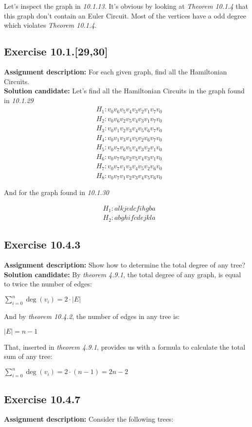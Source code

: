 \documentclass{report}
\newcommand{\cent}[1]{\begin{center}#1\end{center}}
\newcommand{\mAlign}[1]{\begin{align*}#1\end{align*}}
\newcommand{\AssignmentDescription}{\textbf{Assignment description: }}
\newcommand{\Solution}{\textbf{Solution candidate: }}
\newcommand{\Exercise}[1]{\subsection{Exercise #1}}
\begin{document}
	Let's inspect the graph in \textit{10.1.13}. It's obvious by looking at \textit{Theorem 10.1.4} that this graph don't contain an Euler Circuit. Most of the vertices have a odd degree which violates \textit{Theorem 10.1.4}.
	
	\Exercise{10.1.[29,30]}
	
	\AssignmentDescription
	For each given graph, find all the Hamiltonian Circuits.\\
	
	\Solution
	Let's find all the Hamiltonian Circuits in the graph found in \textit{10.1.29}
	\mAlign{&H_1 : v_0 v_6 v_5 v_4 v_3 v_2 v_1 v_7 v_0 \\
				 &H_2 : v_0 v_6 v_2 v_5 v_4 v_3 v_1 v_7 v_0 \\
			 	&H_3 : v_0 v_1 v_2 v_3 v_4 v_5 v_6 v_7 v_0 \\
		 		&H_4 : v_0 v_1 v_3 v_4 v_5 v_2 v_6 v_7 v_0 \\
	 		  	&H_5 : v_0 v_7 v_6 v_5 v_4 v_3 v_2 v_1 v_0 \\
	 		  	&H_6 : v_0 v_7 v_6 v_2 v_5 v_4 v_3 v_1 v_0 \\
	 		  	&H_7 : v_0 v_7 v_1 v_3 v_4 v_5 v_2 v_6 v_0 \\
	 		  	&H_8 : v_0 v_7 v_1 v_2 v_3 v_4 v_5 v_6 v_0}
  	
  	And for the graph found in \textit{10.1.30}
 	
 	\mAlign{&H_1 : a l k j e d c f i h g b a \\
 				  &H_2 : a b g h i f c d e j k l a}
	
	\Exercise{10.4.3}
	
	\AssignmentDescription
	Show how to determine the total degree of any tree?\\
	
	\Solution
	By \textit{theorem 4.9.1}, the total degree of any graph, is equal to twice the number of edges:
	
	\cent{$\sum_{i = 0}^{n} \deg(v_i) = 2 \cdot |E|$}
	
	And by \textit{theorem 10.4.2}, the number of edges in any tree is:
	
	\cent{$|E| = n-1$}
	
	That, inserted in \textit{theorem 4.9.1}, provides us with a formula to calculate the total sum of any tree:
	
	\cent{$\sum_{i = 0}^{n} \deg(v_i) = 2 \cdot (n-1) = 2n-2$}
	
	\Exercise{10.4.7}
	\AssignmentDescription
	Consider the following trees:
	
\end{document}

